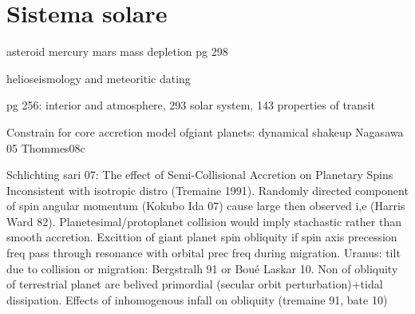 {\let\clearpage\relax\let\cleardoublepage\relax
\chapter{Sistema solare}
}


\begin{workout}
asteroid mercury mars mass depletion pg 298
\end{workout}

\begin{workout}
helioseismology and meteoritic dating
\end{workout}


\begin{workout}
pg 256: interior and atmosphere, 293 solar system, 143 properties of transit
\end{workout}

\begin{workout}

\end{workout}

\begin{workout}

\end{workout}


\begin{workout}
Constrain for core accretion model ofgiant planets: dynamical shakeup Nagasawa 05 Thommes08c
\end{workout}


\begin{workout}

\end{workout}



\begin{workout}
Schlichting sari 07: The effect of Semi-Collisional Accretion on Planetary Spins
Inconsistent with isotropic distro (Tremaine 1991). Randomly directed component of spin angular momentum (Kokubo Ida 07) cause large then observed i,e (Harris Ward 82).
Planetesimal/protoplanet collision would imply stachastic rather than smooth accretion.
Excittion of giant planet spin obliquity if spin axis precession freq pass through resonance with orbital prec freq during migration.
Uranus: tilt due to collision or migration: Bergstralh 91 or Bou\'e Laskar 10.
Non of obliquity of terrestrial planet are belived primordial (secular orbit perturbation)+tidal dissipation.
Effects of inhomogenous infall on obliquity (tremaine 91, bate 10)
\end{workout}



